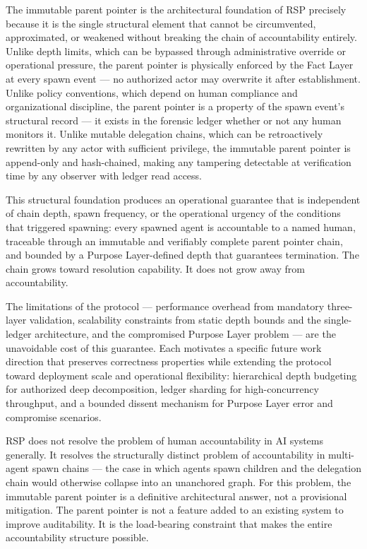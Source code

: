 The immutable parent pointer is the architectural foundation of RSP precisely because it is the single structural element that cannot be circumvented, approximated, or weakened without breaking the chain of accountability entirely. Unlike depth limits, which can be bypassed through administrative override or operational pressure, the parent pointer is physically enforced by the Fact Layer at every spawn event — no authorized actor may overwrite it after establishment. Unlike policy conventions, which depend on human compliance and organizational discipline, the parent pointer is a property of the spawn event's structural record — it exists in the forensic ledger whether or not any human monitors it. Unlike mutable delegation chains, which can be retroactively rewritten by any actor with sufficient privilege, the immutable parent pointer is append-only and hash-chained, making any tampering detectable at verification time by any observer with ledger read access.

This structural foundation produces an operational guarantee that is independent of chain depth, spawn frequency, or the operational urgency of the conditions that triggered spawning: every spawned agent is accountable to a named human, traceable through an immutable and verifiably complete parent pointer chain, and bounded by a Purpose Layer-defined depth that guarantees termination. The chain grows toward resolution capability. It does not grow away from accountability.

The limitations of the protocol — performance overhead from mandatory three-layer validation, scalability constraints from static depth bounds and the single-ledger architecture, and the compromised Purpose Layer problem — are the unavoidable cost of this guarantee. Each motivates a specific future work direction that preserves correctness properties while extending the protocol toward deployment scale and operational flexibility: hierarchical depth budgeting for authorized deep decomposition, ledger sharding for high-concurrency throughput, and a bounded dissent mechanism for Purpose Layer error and compromise scenarios.

RSP does not resolve the problem of human accountability in AI systems generally. It resolves the structurally distinct problem of accountability in multi-agent spawn chains — the case in which agents spawn children and the delegation chain would otherwise collapse into an unanchored graph. For this problem, the immutable parent pointer is a definitive architectural answer, not a provisional mitigation. The parent pointer is not a feature added to an existing system to improve auditability. It is the load-bearing constraint that makes the entire accountability structure possible.
